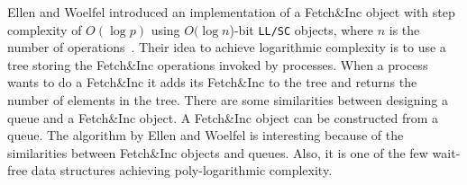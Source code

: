 Ellen and Woelfel introduced an implementation of a Fetch\&Inc object
with step complexity of $O(\log p)$ using $O(\log n$)-bit
\texttt{LL/SC} objects, where $n$ is the number of
operations~\cite{10.1007/978-3-642-41527-2_20}. Their idea to achieve
logarithmic complexity is to use a tree storing the Fetch\&Inc
operations invoked by processes. When a process wants to do a
Fetch\&Inc it adds its Fetch\&Inc to the tree and returns the number
of elements in the tree. There are some similarities between designing
a queue and a Fetch\&Inc object. A Fetch\&Inc object can be
constructed from a queue. The algorithm by Ellen and Woelfel is
interesting because of the similarities between Fetch\&Inc objects and
queues. Also, it is one of the few wait-free data structures achieving
poly-logarithmic complexity. 

